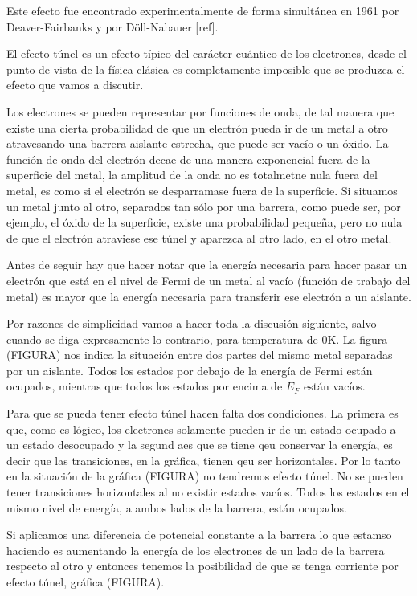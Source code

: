 Este efecto fue encontrado experimentalmente de forma simultánea en 1961 por Deaver-Fairbanks y por Döll-Nabauer [ref].

El efecto túnel es un efecto típico del carácter cuántico de los electrones, desde el punto de vista de la física clásica es completamente imposible que se produzca el efecto que vamos a discutir.

Los electrones se pueden representar por funciones de onda, de tal manera que existe una cierta probabilidad de que un electrón pueda ir de un metal a otro atravesando una barrera aislante estrecha, que puede ser vacío o un óxido. La función de onda del electrón decae de una manera exponencial fuera de la superficie del metal, la amplitud de la onda no es totalmetne nula fuera del metal, es como si el electrón se desparramase fuera de la superficie. Si situamos un metal junto al otro, separados tan sólo por una barrera, como puede ser, por ejemplo, el óxido de la superficie, existe una probabilidad pequeña, pero no nula de que el electrón atraviese ese túnel y aparezca al otro lado, en el otro metal.

Antes de seguir hay que hacer notar que la energía necesaria para hacer pasar un electrón que está en el nivel de Fermi de un metal al vacío (función de trabajo del metal) es mayor que la energía necesaria para transferir ese electrón a un aislante.

Por razones de simplicidad vamos a hacer toda la discusión siguiente, salvo cuando se diga expresamente lo contrario, para temperatura de 0K. La figura (FIGURA) nos indica la situación entre dos partes del mismo metal separadas por un aislante. Todos los estados por debajo de la energía de Fermi están ocupados, mientras que todos los estados por encima de $E_F$ están vacíos.

Para que se pueda tener efecto túnel hacen falta dos condiciones. La primera es que, como es lógico, los electrones solamente pueden ir de un estado ocupado a un estado desocupado y la segund aes que se tiene qeu conservar la energía, es decir que las transiciones, en la gráfica, tienen qeu ser horizontales. Por lo tanto en la situación de la gráfica (FIGURA) no tendremos efecto túnel. No se pueden tener transiciones horizontales al no existir estados vacíos. Todos los estados en el mismo nivel de energía, a ambos lados de la barrera, están ocupados.

Si aplicamos una diferencia de potencial constante a la barrera lo que estamso haciendo es aumentando la energía de los electrones de un lado de la barrera respecto al otro y entonces tenemos la posibilidad de que se tenga corriente por efecto túnel, gráfica (FIGURA).

